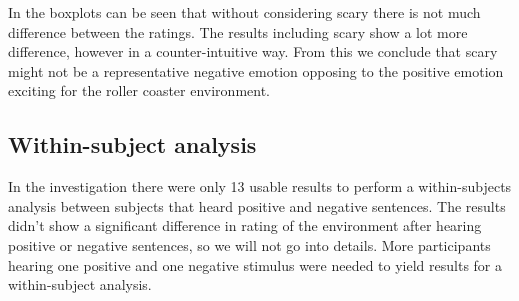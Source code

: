 \documentclass[Results.tex]{subfiles}
\begin{document}
In the boxplots can be seen that without considering scary there is not much difference between the ratings. The results including scary show a lot more difference, however in a counter-intuitive way. From this we conclude that scary might not be a representative negative emotion opposing to the positive emotion exciting for the roller coaster environment.

\subsection{Within-subject analysis}
In the investigation there were only 13 usable results to perform a within-subjects analysis between subjects that heard positive and negative sentences. The results didn't show a significant difference in rating of the environment after hearing positive or negative sentences, so we will not go into details. More participants hearing one positive and one negative stimulus were needed to yield results for a within-subject analysis. 
 
\end{document}
